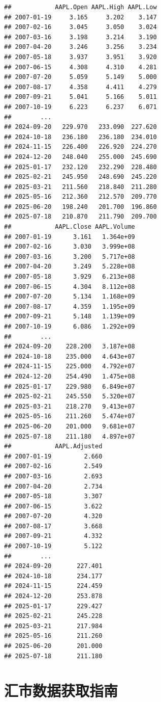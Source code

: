 \documentclass[]{ctexbook}
\begin{document}
\begin{verbatim}
##            AAPL.Open AAPL.High AAPL.Low
## 2007-01-19     3.165     3.202    3.147
## 2007-02-16     3.045     3.050    3.024
## 2007-03-16     3.198     3.214    3.190
## 2007-04-20     3.246     3.256    3.234
## 2007-05-18     3.937     3.951    3.920
## 2007-06-15     4.308     4.310    4.281
## 2007-07-20     5.059     5.149    5.000
## 2007-08-17     4.358     4.411    4.279
## 2007-09-21     5.041     5.166    5.011
## 2007-10-19     6.223     6.237    6.071
##        ...                             
## 2024-09-20   229.970   233.090  227.620
## 2024-10-18   236.180   236.180  234.010
## 2024-11-15   226.400   226.920  224.270
## 2024-12-20   248.040   255.000  245.690
## 2025-01-17   232.120   232.290  228.480
## 2025-02-21   245.950   248.690  245.220
## 2025-03-21   211.560   218.840  211.280
## 2025-05-16   212.360   212.570  209.770
## 2025-06-20   198.240   201.700  196.860
## 2025-07-18   210.870   211.790  209.700
##            AAPL.Close AAPL.Volume
## 2007-01-19      3.161   1.364e+09
## 2007-02-16      3.030   3.999e+08
## 2007-03-16      3.200   5.717e+08
## 2007-04-20      3.249   5.228e+08
## 2007-05-18      3.929   6.213e+08
## 2007-06-15      4.304   8.112e+08
## 2007-07-20      5.134   1.168e+09
## 2007-08-17      4.359   1.195e+09
## 2007-09-21      5.148   1.139e+09
## 2007-10-19      6.086   1.292e+09
##        ...                       
## 2024-09-20    228.200   3.187e+08
## 2024-10-18    235.000   4.643e+07
## 2024-11-15    225.000   4.792e+07
## 2024-12-20    254.490   1.475e+08
## 2025-01-17    229.980   6.849e+07
## 2025-02-21    245.550   5.320e+07
## 2025-03-21    218.270   9.413e+07
## 2025-05-16    211.260   5.474e+07
## 2025-06-20    201.000   9.681e+07
## 2025-07-18    211.180   4.897e+07
##            AAPL.Adjusted
## 2007-01-19         2.660
## 2007-02-16         2.549
## 2007-03-16         2.693
## 2007-04-20         2.734
## 2007-05-18         3.307
## 2007-06-15         3.622
## 2007-07-20         4.320
## 2007-08-17         3.668
## 2007-09-21         4.332
## 2007-10-19         5.122
##        ...              
## 2024-09-20       227.401
## 2024-10-18       234.177
## 2024-11-15       224.459
## 2024-12-20       253.878
## 2025-01-17       229.427
## 2025-02-21       245.228
## 2025-03-21       217.984
## 2025-05-16       211.260
## 2025-06-20       201.000
## 2025-07-18       211.180
\end{verbatim}

\section{汇市数据获取指南}\label{ux6c47ux5e02ux6570ux636eux83b7ux53d6ux6307ux5357}
\end{document}
